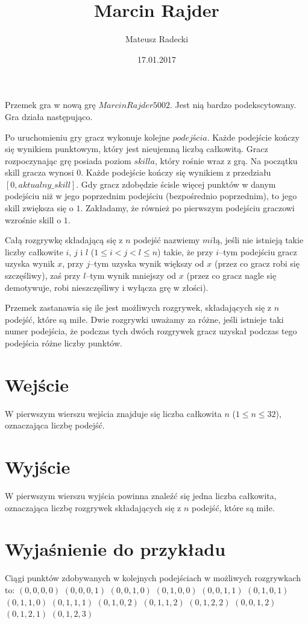 \documentclass[zad,zawodnik,utf8]{sinol}
\title{Marcin Rajder}
\author{Mateusz Radecki} %
\date{17.01.2017}
\begin{document}
\begin{tasktext}%

Przemek gra w nową grę $Marcin Rajder 5002$. Jest nią bardzo podekscytowany. Gra działa następująco.

Po uruchomieniu gry gracz wykonuje kolejne $podejścia$. Każde podejście kończy się wynikiem punktowym, który jest nieujemną liczbą całkowitą. Gracz rozpoczynając grę posiada poziom $skilla$, który rośnie wraz z grą. Na początku skill gracza wynosi $0$. Każde podejście kończy się wynikiem z przedziału $[0, aktualny\_skill]$. Gdy gracz zdobędzie ścisle więcej punktów w danym podejściu niż w jego poprzednim podejściu (bezpośrednio poprzednim), to jego skill zwiększa się o $1$. Zakładamy, że również po pierwszym podejściu graczowi wzrośnie skill o $1$.

Całą rozgrywkę składającą się z $n$ podejść nazwiemy $miłą$, jeśli nie istnieją takie liczby całkowite $i$, $j$ i $l$ ($1 \leq i < j < l \leq n$) takie, że przy $i$--tym podejściu gracz uzyska wynik $x$, przy $j$--tym uzyska wynik większy od $x$ (przez co gracz robi się szczęśliwy), zaś przy $l$--tym wynik mniejszy od $x$ (przez co gracz nagle się demotywuje, robi nieszczęśliwy i wyłącza grę w złości).

Przemek zastanawia się ile jest możliwych rozgrywek, składających się z $n$ podejść, które są miłe. Dwie rozgrywki uważamy za różne, jeśli istnieje taki numer podejścia, że podczas tych dwóch rozgrywek gracz uzyskał podczas tego podejścia różne liczby punktów.

  \section{Wejście}
W pierwszym wierszu wejścia znajduje się liczba całkowita $n$ ($1 \leq n \leq 32$), oznaczająca liczbę podejść.

  \section{Wyjście}
W pierwszym wierszu wyjścia powinna znaleźć się jedna liczba całkowita, oznaczająca liczbę rozgrywek składających się z $n$ podejść, które są miłe.
  
\makecompactexample

  \section{Wyjaśnienie do przykładu}
Ciągi punktów zdobywanych w kolejnych podejściach w możliwych rozgrywkach to:
\vskip 1mm
$(0, 0, 0, 0)$
\vskip 1mm
$(0, 0, 0, 1)$
\vskip 1mm
$(0, 0, 1, 0)$
\vskip 1mm
$(0, 1, 0, 0)$
\vskip 1mm
$(0, 0, 1, 1)$
\vskip 1mm
$(0, 1, 0, 1)$
\vskip 1mm
$(0, 1, 1, 0)$
\vskip 1mm
$(0, 1, 1, 1)$
\vskip 1mm
$(0, 1, 0, 2)$
\vskip 1mm
$(0, 1, 1, 2)$
\vskip 1mm
$(0, 1, 2, 2)$
\vskip 1mm
$(0, 0, 1, 2)$
\vskip 1mm
$(0, 1, 2, 1)$
\vskip 1mm
$(0, 1, 2, 3)$

\end{tasktext}
\end{document}
